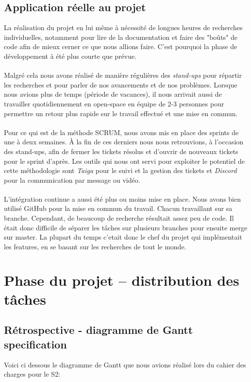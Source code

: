 \documentclass[french]{report}
\begin{document}
\section{Application réelle au projet}
La réalisation du projet en lui même à nécessité de longues heures de recherches
individuelles, notamment pour lire de la documentation et faire des "boûts" de
code afin de mieux cerner ce que nous allions faire. C'est pourquoi la phase de développement à
été plus courte que prévue.
\\
\\
Malgré cela nous avons réalisé de manière régulières des \emph{stand-ups} pour
répartir les recherches et pour parler de nos avancements et de nos problèmes.
Lorsque nous avions
plus de temps (période de vacances), il nous arrivait aussi de travailler
quotidiennement en open-space en équipe de 2-3 personnes pour permettre un
retour plus rapide sur le travail effectué et une mise en commun.
\\
\\
Pour ce qui est de la méthode SCRUM, nous avons mis en place des sprints de une
à deux semaines. À la fin de ces derniers nous nous retrouvions, à
l'occasion des stand-ups, afin de fermer les tickets résolus et d’ouvrir de
nouveaux tickets pour le sprint d’après. Les outils qui nous ont servi
pour exploiter le potentiel de cette méthodologie
sont \emph{Taiga} pour le suivi et la gestion des tickets et \emph{Discord}
pour la communication par message ou vidéo.
\\
\\
L'intégration continue a aussi été plus ou moins mise en place. Nous avons bien
utilisé GitHub pour la mise en commun du travail. Chacun travaillant sur sa
branche. Cependant, de beaucoup de recherche résultait assez peu de code. Il
était donc difficile de séparer les tâches sur plusieurs branches pour ensuite
merge sur master. La plupart du temps c'etait donc le chef du projet qui
implémentait les features, en se basant sur les recherches de tout le monde.

\chapter{Phase du projet – distribution des tâches}

\newpage

\section{Rétrospective - diagramme de Gantt specification}
Voici ci dessous le diagramme de Gantt que nous avions réalisé lors du cahier
des charges pour le S2:
\end{document}
